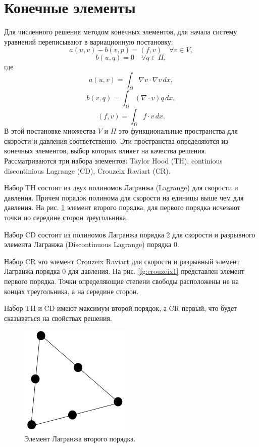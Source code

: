 \documentclass[12pt]{article}
\begin{document}
\section{Конечные элементы}
Для численного решения методом конечных элементов, для начала систему уравнений переписывают в вариационную постановку:
\begin{equation}
a(u,v)-b(v,p)=(f,v) \quad \forall v \in V,
\end{equation}
\begin{equation}
b(u,q)=0 \quad \forall q \in \Pi,
\end{equation}
где 
\begin{equation}
a(u,v)=\int_\Omega \nabla v \cdot \nabla v \, dx,
\end{equation}
\begin{equation}
b(v,q)=\int_\Omega (\nabla \cdot v) q \, dx,
\end{equation}
\begin{equation}
(f,v)=\int_\Omega f \cdot v \, dx.
\end{equation}
В этой постановке множества $V$ и $\Pi$ это функциональные пространства для скорости и давления соответственно. Эти пространства определяются из конечных элементов, выбор которых влияет на качества решения. Рассматриваются три набора элементов: Taylor Hood (TH), continious discontinious Lagrange (CD), Crouzeix Raviart (CR). 

Набор TH состоит из двух полиномов Лагранжа (Lagrange) для скорости и давления. Причем порядок полинома для скорости на единицы выше чем для давления. На рис. \ref{fg:lagrange2} элемент второго порядка, для первого порядка исчезают точки по середине сторон треугольника.

Набор CD состоит из полиномов Лагранжа порядка 2 для скорости и разрывного элемента Лагранжа (Discontinuous Lagrange) порядка 0.

Набор CR это элемент Crouzeix Raviart для скорости и разрывный элемент Лагранжа порядка 0 для давления. На рис. \ref{fg:crouzeix1} представлен элемент первого порядка. Точки определяющие степени свободы расположены не на концах треугольника, а на середине сторон.

Набор TH и CD имеют максимум второй порядок, а CR первый, что будет сказываться на свойствах решения.

\begin{figure}
	\begin{center}
		\includegraphics[width=200px]{pics/lagrange2}
		\caption{Элемент Лагранжа второго порядка.}
		\label{fg:lagrange2}
	\end{center}
\end{figure}
\end{document}

